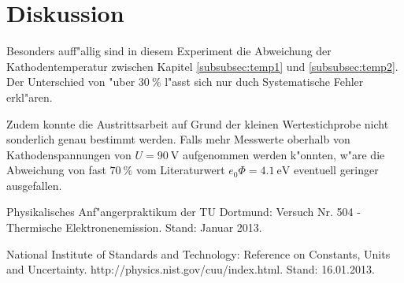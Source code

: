\section{Diskussion}
	\label{diskussion}
	Besonders auff"allig sind in diesem Experiment die Abweichung der Kathodentemperatur zwischen Kapitel \ref{subsubsec:temp1} und \ref{subsubsec:temp2}.
	Der Unterschied von "uber $\SI{30}{\percent}$ l"asst sich nur duch Systematische Fehler erkl"aren.

	Zudem konnte die Austrittsarbeit auf Grund der kleinen Wertestichprobe nicht sonderlich genau bestimmt werden.
	Falls mehr Messwerte oberhalb von Kathodenspannungen von $U = \SI{90}{\volt}$ aufgenommen werden k"onnten, w"are die Abweichung von fast $\SI{70}{\percent}$ vom Literaturwert $e_0 \Phi = \SI{4.1}{\electronvolt}$ eventuell geringer ausgefallen.

\begin{thebibliography}{9}
	 Physikalisches Anf"angerpraktikum der TU Dortmund: Versuch Nr. 504 - Thermische Elektronenemission. Stand: Januar 2013.

	 National Institute of Standards and Technology: Reference on Constants, Units and Uncertainty. http://physics.nist.gov/cuu/index.html. Stand: 16.01.2013.
\end{thebibliography}
